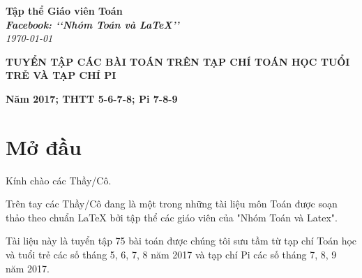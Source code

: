 \documentclass[12pt,a4paper,oneside]{book}
\renewcommand{\baselinestretch}{1.4}
\theoremstyle{nonumberplain}
\begin{document}
	\providecommand*{\dx}{\ensuremath{\mathrm{\,d}}x}
	\providecommand*{\unit}[1]{\ensuremath{\mathrm{\,#1}}}
	
	\begin{titlepage}
		\begin{flushright}
			\fontsize{17}{0}\selectfont
			\textbf{Tập thể Giáo viên Toán}\\
			\textbf{\textit{Facebook: \lq\lq Nhóm Toán và LaTeX\rq\rq}}\\
			\textit{\color{red}\today}
		\end{flushright}
		
		\vspace{4cm}
		
		\begin{flushright}
			
			\vspace{1cm}
			
			\textbf{\fontsize{30}{0}\selectfont T\fontsize{20}{0}\selectfont UYỂN TẬP CÁC BÀI TOÁN TRÊN TẠP CHÍ TOÁN HỌC TUỔI TRẺ VÀ TẠP CHÍ PI}
			
			\vspace{1cm}
			
		\end{flushright}
		
		\vfill{
			\begin{flushright}
				\fontsize{17}{0}\textbf{Năm 2017; THTT 5-6-7-8; Pi 7-8-9}
			\end{flushright}
		}
	\end{titlepage}
	\pagestyle{empty}
	\renewcommand{\headrulewidth}{0.4pt}
	
	{\renewcommand{\baselinestretch}{1.3}
		\tableofcontents
	}
	
	\pagestyle{fancy}
	\lhead{\empty}
	\rhead{\empty}
	\lfoot{\currfilename}
	\chapter*{Mở đầu}
	Kính chào các Thầy/Cô.
	
	\vspace{0.6cm}
	
	\noindent Trên tay các Thầy/Cô đang là một trong những tài liệu môn Toán được soạn thảo theo chuẩn \LaTeX{} bởi tập thể các giáo viên của "Nhóm Toán và Latex".
	
	\vspace{0.6cm}
	
	\noindent Tài liệu này là tuyển tập 75 bài toán được chúng tôi sưu tầm từ  tạp chí Toán học và tuổi trẻ các số tháng 5, 6, 7, 8 năm 2017 và tạp chí Pi các số tháng 7, 8, 9 năm 2017.
	
	
	
	
	
	
	
	
\end{document}
